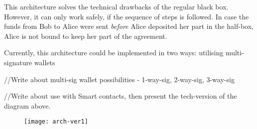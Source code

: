 This architecture solves the technical drawbacks of the regular black box. However, it can only work safely, if the sequence of steps is followed. In case the funds from Bob to Alice were sent \textit{before} Alice deposited her part in the half-box, Alice is not bound to keep her part of the agreement.

Currently, this architecture could be implemented in two ways: utilising multi-signature wallets

//Write about multi-sig wallet possibilities - 1-way-sig, 2-way-sig, 3-way-sig

//Write about use with Smart contacts, then present the tech-version of the diagram above.











\begin{figure}[ht]
    \centering
    \texttt{[image: arch-ver1]}
    \caption{}
    \label{fig:arch-ver1}
\end{figure}